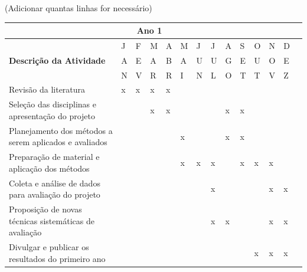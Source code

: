 \documentclass[
  11pt,				
  openright,	
  twoside,	
  a4paper,
  brazil,	
  oldfontcommands,
  ]{abntex2}
\begin{document}
\begingroup
\renewcommand{\section}[2]{}%
\renewcommand{\chapter}[2]{}%

{\normalsize


}

\endgroup



\vspace{5mm}
  (Adicionar quantas linhas for necessário)


\begin{table}[H]
\begin{center}
\begin{tabularx}{\textwidth}{|p{10cm}|X|X|X|X|X|X|X|X|X|X|X|X|X|}
\multicolumn{13}{|c|}{\cellcolor{lightgray} \textbf{Ano 1}} \\\hline
\cellcolor{lightgray} & J & F & M & A & M & J & J & A & S & O & N & D \\
\cellcolor{lightgray}  \textbf{Descri\c{c}\~{a}o da Atividade} & A & E & A & B & A & U & U & G & E & U & O & E \\
\cellcolor{lightgray}  & N & V & R & R & I & N & L & O & T & T & V & Z \\\hline
Revisão da literatura       		&  x  & x & x  & x &  &  &   &   &   &   &   &   \\\hline
Seleção das disciplinas  e apresentação do projeto   	&    &   & x & x &   &   &   &  x &  x  &   &    &   \\\hline
Planejamento dos métodos a 
serem aplicados e avaliados 	&    &   &   &  & x  &   &   & x  &  x  &   &    &   \\\hline
Preparação de material e aplicação dos métodos 		&    &   &   &  & x  & x  & x  &   &  x  &  x & x   &   \\\hline
Coleta e análise de dados para 
avaliação do projeto 			&    &   &    &   &   &   & x  &   &    &   & x   & x  \\\hline
Proposição de novas técnicas 
sistemáticas de avaliação        &    &   &    &   &   &   & x  & x  &    &   &  x  & x  \\\hline
Divulgar e publicar os 
resultados do primeiro ano  	&    &   &   &   &   &   &  &  &  & x & x & x \\\hline
\end{tabularx}
\end{center}
\end{table}
\vspace{-10mm}
\end{document}
